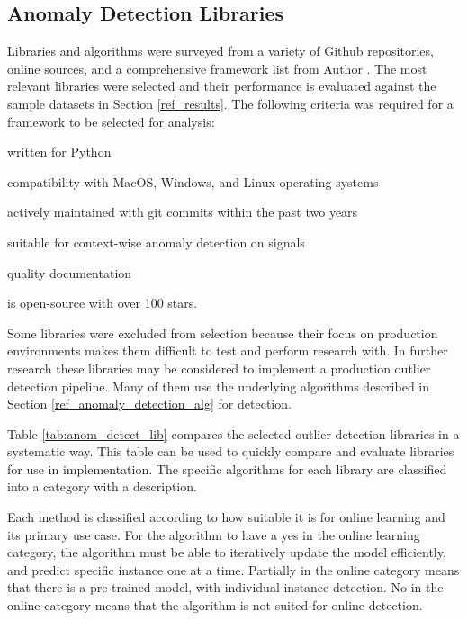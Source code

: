 \subsection{Anomaly Detection Libraries}
\label{ref_code_libraries}
 Libraries and algorithms were surveyed from a variety of Github repositories, online sources, and a comprehensive framework list from Author \cite{medico2020-ts-list}. The most relevant libraries were selected and their performance is evaluated against the sample datasets in Section \ref{ref_results}. The following criteria was required for a framework to be selected for analysis:
 \begin{inlinelist}
     \item written for Python
     \item compatibility with MacOS, Windows, and Linux operating systems
     \item actively maintained with git commits within the past two years
     \item suitable for context-wise anomaly detection on signals
     \item quality documentation
     \item is open-source with over 100 stars.
 \end{inlinelist}


Some libraries were excluded from selection because their focus on production environments makes them difficult to test and perform research with. In further research these libraries may be considered to implement a production outlier detection pipeline. Many of them use the underlying algorithms described in Section \ref{ref_anomaly_detection_alg} for detection.

Table \ref{tab:anom_detect_lib} compares the selected outlier detection libraries in a systematic way. This table can be used to quickly compare and evaluate libraries for use in implementation. The specific algorithms for each library are classified into a category with a description.

Each method is classified according to how suitable it is for online learning and its primary use case. For the algorithm to have a yes in the online learning category, the algorithm must be able to iteratively update the model efficiently, and predict specific instance one at a time. Partially in the online category means that there is a pre-trained model, with individual instance detection. No in the online category means that the algorithm is not suited for online detection.




